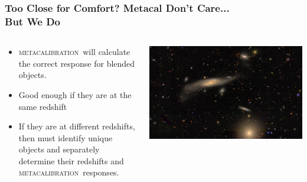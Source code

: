 \documentclass{beamer}
\newcommand{\mcal}{\textsc{metacalibration}}
\begin{document}
\frame
{
    \frametitle{Too Close for Comfort?  Metacal Don't Care... \\But We Do}
 
 
    \begin{columns}
        \begin{column}{0.5\textwidth}
            \begin{itemize}
                \item \mcal\ will calculate the correct response
                    for blended objects.
                \item Good enough if they are at the same redshift
                \item If they are at different redshifts, then must
                    identify unique objects and separately
                    determine their redshifts and \mcal\ responses.
            \end{itemize}
        \end{column}
        \begin{column}{0.5\textwidth}
            \begin{center}
                \includegraphics[width=1.2\textwidth, angle=90]{DES0056-5248_gri_crop.jpg}
            \end{center}
        \end{column}
    \end{columns}


}
\end{document}
